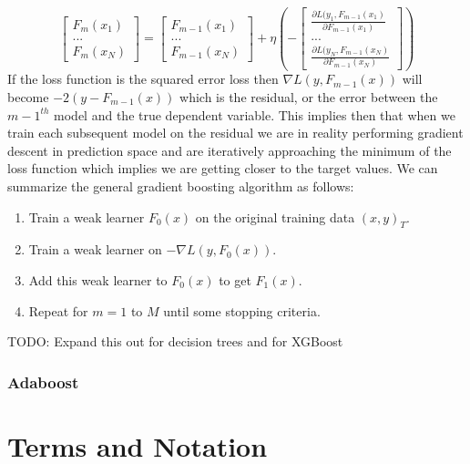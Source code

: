 \documentclass[paper=a4, fontsize=11pt]{scrartcl} %
\numberwithin{equation}{section} %
\numberwithin{figure}{section} %
\numberwithin{table}{section} %
\begin{document}
\begin{equation}
\begin{bmatrix}
F_m(x_1) \\
... \\
F_m(x_N)
\end{bmatrix} = 
\begin{bmatrix}
F_{m-1}(x_1) \\
... \\
F_{m-1}(x_N)
\end{bmatrix} + \eta \left(- 
\begin{bmatrix}
\frac{\partial L(y_1, F_{m-1}(x_1)}{\partial F_{m-1}(x_1)} \\
... \\
\frac{\partial L(y_N, F_{m-1}(x_N)}{\partial F_{m-1}(x_N)}
\end{bmatrix}
\right)
\end{equation}
If the loss function is the squared error loss then $\nabla L(y, F_{m-1}(x))$  will become $-2(y - F_{m-1}(x))$ which is the residual, or the error between the $m-1^{th}$ model and the true dependent variable. This implies then that when we train each subsequent model on the residual we are in reality performing gradient descent in prediction space and are iteratively approaching the minimum of the loss function which implies we are getting closer to the target values. We can summarize the general gradient boosting algorithm as follows:

\begin{enumerate}
\item Train a weak learner $F_0(x)$ on the original training data $(x,y)_T$.
\item Train a weak learner on $-\nabla L(y, F_{0}(x))$.
\item Add this weak learner to $F_0(x)$ to get $F_1(x)$.
\item Repeat for $m=1$ to $M$ until some stopping criteria.
\end{enumerate}

TODO: Expand this out for decision trees and for XGBoost


\subsubsection{Adaboost} \label{section:ada}



\section{Terms and Notation}
\end{document}
